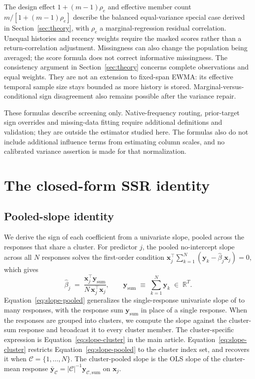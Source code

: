 \documentclass[11pt,a4paper]{article}
\begin{document}
The design effect $1+(m-1)\rho_e$ and effective member count
$m/[1+(m-1)\rho_e]$ describe the balanced equal-variance special case derived
in Section~\ref{sec:theory}, with $\rho_e$ a marginal-regression residual
correlation. Unequal histories and recency weights require the masked scores
rather than a return-correlation adjustment. Missingness can also change the
population being averaged; the score formula does not correct informative
missingness. The consistency argument in Section~\ref{sec:theory} concerns
complete observations and equal weights.
They are not an extension to fixed-span EWMA: its effective temporal sample size
stays bounded as more history is stored. Marginal-versus-conditional sign
disagreement also remains possible after the variance repair.

These formulas describe screening only. Native-frequency routing, prior-target
sign overrides and missing-data fitting require additional definitions and
validation; they are outside the estimator studied here. The formulas also do
not include additional influence terms from estimating column scales, and no
calibrated variance assertion is made for that normalization.

\FloatBarrier

\section{The closed-form SSR identity} \label{app:ssr}
\subsection{Pooled-slope identity}\label{app:slope-identity}

We derive the sign of each coefficient from a univariate slope, pooled across the
responses that share a cluster. For predictor $j$, the pooled no-intercept slope
across all $N$ responses solves the first-order condition
$\bm{x}_j^\top \sum_{k=1}^{N} (\bm{y}_k - \hat{\beta}_j \bm{x}_j) = 0$, which gives
%
\begin{equation} \label{eq:slope-pooled}
	\hat{\beta}_j \;=\; \frac{\bm{x}_j^\top \bm{y}_{\mathrm{sum}}}
	{N\, \bm{x}_j^\top \bm{x}_j},
	\qquad
	\bm{y}_{\mathrm{sum}} \;\equiv\; \sum_{k=1}^{N} \bm{y}_k \;\in\; \mathbb{R}^T.
\end{equation}
%
Equation~\eqref{eq:slope-pooled} generalizes the single-response univariate slope
of \citet{Chatterjee+Hastie+Tibshirani:2025} to many responses, with the response
sum $\bm{y}_{\mathrm{sum}}$ in place of a single response. When the responses are
grouped into clusters, we compute the slope against the cluster-sum response and
broadcast it to every cluster member.
%
The cluster-specific expression is Equation~\eqref{eq:slope-cluster} in the main article.
%
Equation~\eqref{eq:slope-cluster} restricts Equation~\eqref{eq:slope-pooled} to
the cluster index set, and recovers it when $\mathcal{C} = \{1, \ldots, N\}$. The
cluster-pooled slope is the OLS slope of the cluster-mean response
$\bar{\bm{y}}_{\mathcal{C}} = |\mathcal{C}|^{-1} \bm{y}_{\mathcal{C}, \mathrm{sum}}$
on $\bm{x}_j$.
\end{document}
